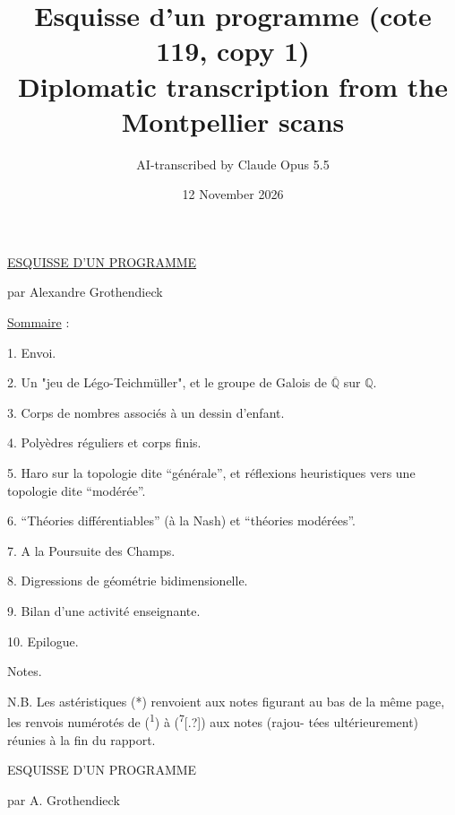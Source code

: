 \documentclass[11pt]{article}
\title{Esquisse d'un programme (cote 119, copy 1)\\[4pt]\large Diplomatic transcription from the Montpellier scans}
\author{AI-transcribed by Claude Opus 5.5}
\date{12 November 2026}
\newcommand{\scanpage}[1]{\par\bigskip\noindent{\small\sffamily[scan #1]}\par}
\newcommand{\mspage}[1]{{\small\sffamily[p.\,#1]}}
\newcommand{\uline}[1]{\underline{#1}}
\newcommand{\unsure}[1]{[#1?]}
\begin{document}
\maketitle

\scanpage{119/2}
\uline{ESQUISSE D'UN PROGRAMME}

par Alexandre Grothendieck

\uline{Sommaire} :

1. Envoi.

2. Un "jeu de Légo-Teichmüller", et le groupe de Galois de $\overline{\mathbb{Q}}$ sur $\mathbb{Q}$.

3. Corps de nombres associés à un dessin d'enfant.

4. Polyèdres réguliers et corps finis.

5. Haro sur la topologie dite ``générale'', et réflexions heuristiques
vers une topologie dite ``modérée''.

6. ``Théories différentiables'' (à la Nash) et ``théories modérées''.

7. A la Poursuite des Champs.

8. Digressions de géométrie bidimensionelle.

9. Bilan d'une activité enseignante.

10. Epilogue.

Notes.

N.B. Les astéristiques (*) renvoient aux notes figurant au bas de
la même page, les renvois numérotés de (\textsuperscript{1}) à (\textsuperscript{7}\unsure{.}) aux notes (rajou-%
tées ultérieurement) réunies à la fin du rapport.

\mspage{2}

\clearpage
\scanpage{119/3}
\mspage{1}

ESQUISSE D'UN PROGRAMME

par A. Grothendieck
\end{document}
